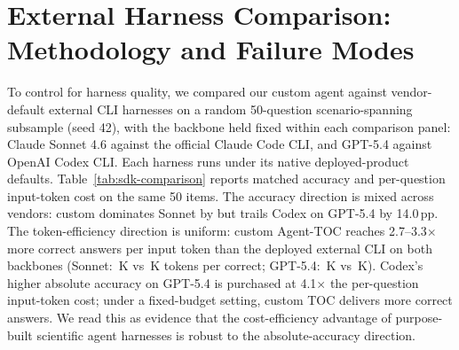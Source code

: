 \documentclass{article}
\begin{document}
\section{External Harness Comparison: Methodology and Failure Modes}
\label{sec:appendix-external-harness}

To control for harness quality, we compared our custom agent against vendor-default external CLI harnesses on a random 50-question scenario-spanning subsample (seed 42), with the backbone held fixed within each comparison panel: Claude Sonnet 4.6 against the official Claude Code CLI, and GPT-5.4 against OpenAI Codex CLI. Each harness runs under its native deployed-product defaults. Table~\ref{tab:sdk-comparison} reports matched accuracy and per-question input-token cost on the same 50 items. The accuracy direction is mixed across vendors: custom dominates Sonnet by \SDKCustomTOCMinusSDK{} but trails Codex on GPT-5.4 by 14.0\,pp. The token-efficiency direction is uniform: custom Agent-TOC reaches 2.7--3.3$\times$ more correct answers per input token than the deployed external CLI on both backbones (Sonnet: \SonnetCustomTOCPerCorrectK\,K vs \SDKSonnetPerCorrectK\,K tokens per correct; GPT-5.4: \GPTFiveFourCustomTOCPerCorrectK\,K vs \CodexGPTFiveFourPerCorrectK\,K). Codex's higher absolute accuracy on GPT-5.4 is purchased at 4.1$\times$ the per-question input-token cost; under a fixed-budget setting, custom TOC delivers more correct answers. We read this as evidence that the cost-efficiency advantage of purpose-built scientific agent harnesses is robust to the absolute-accuracy direction.
\end{document}
